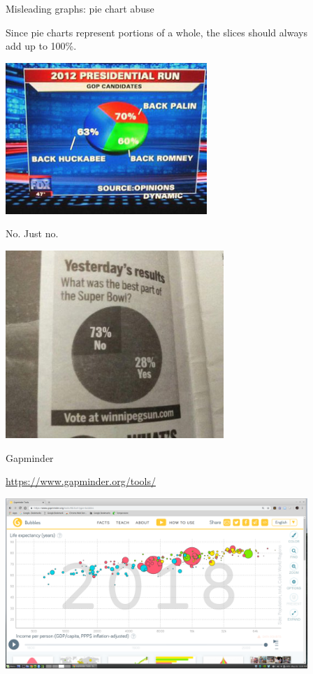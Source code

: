 \documentclass[xcolor=table, aspectratio=169, bigger, handout]{beamer}
\begin{document}
\begin{frame}{Misleading graphs: pie chart abuse}
\begin{block}{}
Since pie charts represent portions of a whole, the slices should always\\ add up to 100\%.
\end{block}
\pause
\begin{center}
\includegraphics[width=3in]{../images/wk04_bad_piechart}
\end{center}

\end{frame}

\begin{frame}{No. Just no.}
\begin{center}
\includegraphics[width=3.25in]{../images/wk04_sb_piechart}
\end{center}
\end{frame}

\begin{frame}{Gapminder}

\url{https://www.gapminder.org/tools/}

\begin{center}
\includegraphics[width=4.5in]{../images/wk04_gapminder}
\end{center}


\end{frame}
\end{document}
